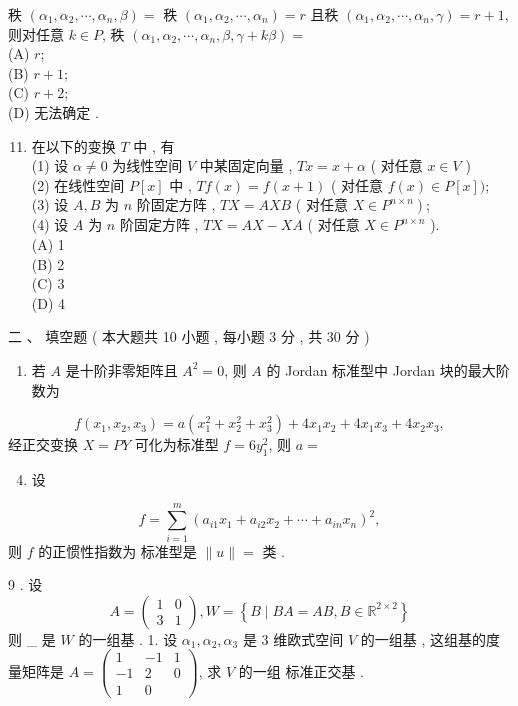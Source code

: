\documentclass[10pt]{article}
\begin{document}
{\begin{enumerate}
\end{enumerate}
 秩  $\left(\alpha_{1}, \alpha_{2}, \cdots, \alpha_{n}, \beta\right)=$  秩  $\left(\alpha_{1}, \alpha_{2}, \cdots, \alpha_{n}\right)=r$  且秩  $\left(\alpha_{1}, \alpha_{2}, \cdots, \alpha_{n}, \gamma\right)=r+1$,  则对任意  $k \in P$,  秩  $\left(\alpha_{1}, \alpha_{2}, \cdots, \alpha_{n}, \beta, \gamma+k \beta\right)=$\\
(A) $r$;\\
(B) $r+1$;\\
(C) $r+2$;\\
(D)  无法确定 .

\begin{enumerate}
  \setcounter{enumi}{10}
  \item  在以下的变换  $T$  中 ,  有 \\
(1)  设  $\alpha \neq 0$  为线性空间  $V$  中某固定向量 , $T x=x+\alpha$ ( 对任意  $x \in V$ )\\
(2)  在线性空间  $P[x]$  中 , $T f(x)=f(x+1)$ ( 对任意  $f(x) \in P[x])$;\\
(3)  设  $A, B$  为  $n$  阶固定方阵 , $T X=A X B$ ( 对任意  $\left.X \in P^{n \times n}\right)$;\\
(4)  设  $A$  为  $n$  阶固定方阵 , $T X=A X-X A$ ( 对任意  $X \in P^{n \times n}$ ).\\
(A) 1\\
(B) 2\\
(C) 3\\
(D) 4
\end{enumerate}
 二 、 填空题 ( 本大题共  10  小题 ,  每小题  3  分 ,  共  30  分 )

\begin{enumerate}
  \item  若  $A$  是十阶非零矩阵且  $A^{2}=0$,  则  $A$  的  Jordan  标准型中  Jordan  块的最大阶数为 
\end{enumerate}
$$
f\left(x_{1}, x_{2}, x_{3}\right)=a\left(x_{1}^{2}+x_{2}^{2}+x_{3}^{2}\right)+4 x_{1} x_{2}+4 x_{1} x_{3}+4 x_{2} x_{3},
$$
 经正交变换  $X=P Y$  可化为标准型  $f=6 y_{1}^{2}$,  则  $a=$

\begin{enumerate}
  \setcounter{enumi}{3}
  \item  设 
\end{enumerate}
$$
f=\sum_{i=1}^{m}\left(a_{i 1} x_{1}+a_{i 2} x_{2}+\cdots+a_{i n} x_{n}\right)^{2},
$$
 则  $f$  的正惯性指数为   标准型是  $\|u\|=$  类 .

9 .  设 
$$
A=\left(\begin{array}{ll}
1 & 0 \\
3 & 1
\end{array}\right), W=\left\{B \mid B A=A B, B \in \mathbb{R}^{2 \times 2}\right\}
$$
 则  \_  是  $W$  的一组基 . 1.  设  $\alpha_{1}, \alpha_{2}, \alpha_{3}$  是  3  维欧式空间  $V$  的一组基 ,  这组基的度量矩阵是  $A=\left(\begin{array}{ccc}1 & -1 & 1 \\ -1 & 2 & 0 \\ 1 & 0\end{array}\right)$,  求  $V$  的一组   标准正交基 .

}
\end{document}
